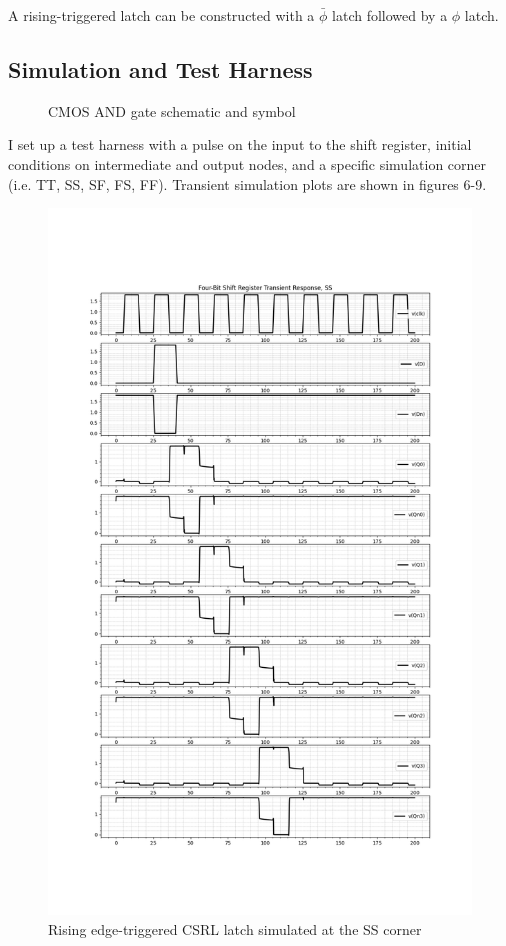 \documentclass[11pt]{article}
\begin{document}
A rising-triggered latch can be constructed with a $\bar{\phi}$ latch followed by a $\phi$ latch.

\subsection*{Simulation and Test Harness}

\begin{figure}[H]
  \centering
  
  \caption{CMOS AND gate schematic and symbol}
\end{figure}

I set up a test harness with a pulse on the input to the shift register, initial conditions on intermediate and output nodes, and a specific simulation corner (i.e. TT, SS, SF, FS, FF). Transient simulation plots are shown in figures 6-9.

\begin{figure}[H]
  \centering
  \includegraphics[width=13cm]{media/csrl_rising_edge_x4_ss.png}
  \caption{Rising edge-triggered CSRL latch simulated at the SS corner}
\end{figure}
\end{document}
